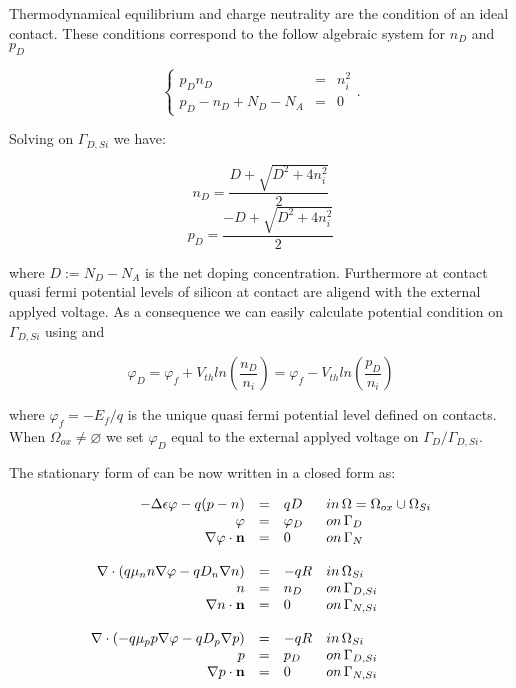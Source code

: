 Thermodynamical equilibrium and charge neutrality are the condition of an ideal contact. These conditions correspond to the follow algebraic system for $n_D$ and $p_D$

\begin{equation}
\label{eq: systemo for dirichlet condition}
\left\{
\begin{array}{lcl}
p_Dn_D & = &n_i^2 \\
p_D -n_D +N_D-N_A & = & 0 
\end{array}
\right. .
\end{equation}

Solving  on $\Gamma_{D,Si}$ we have:

\begin{equation}
n_D = \dfrac{D + \sqrt{D^2+4n_i^2}}{2}
\end{equation}
\begin{equation}
p_D = \dfrac{-D + \sqrt{D^2+4n_i^2}}{2}
\end{equation}

where $D := N_D-N_A$ is the net doping concentration. Furthermore  at contact quasi fermi potential levels of silicon at contact are aligend with the external applyed voltage. As a consequence we can easily calculate potential condition on $\Gamma_{D,Si}$ using  and 

\begin{equation}
\varphi_D = \varphi_f + V_{th}ln\left( \dfrac{n_D}{n_i} \right) = \varphi_f - V_{th}ln\left( \dfrac{p_D}{n_i} \right)
\end{equation}

where $\varphi_f = - E_f / q$ is the unique quasi fermi potential level defined on contacts. When $\Omega_{ox} \neq \varnothing$ we set $\varphi_D$ equal to the external applyed voltage on $\Gamma_D / \Gamma_{D,Si}$.


The stationary form of  can be now written in a closed form as:
 

\begin{equation}
\label{eq: system closed}
\begin{array}{rcll}
- \Delta \epsilon \varphi - q(p-n) & =  & qD & in \, \Omega = \Omega_{ox} \cup \Omega_{Si}\\
\varphi & = & \varphi_D & on \, \Gamma_D \\
\nabla \varphi \cdot \mathbf{n} & = & 0 & on \, \Gamma_N 
\\
\\
\nabla \cdot ( q\mu_n n \nabla \varphi - qD_n \nabla n ) & = & - qR & in \, \Omega_{Si}\\
n & = & n_D & on \, \Gamma_{D,Si} \\
\nabla n \cdot \mathbf{n} & = & 0 & on \, \Gamma_{N,Si}
\\
\\
\nabla \cdot (- q\mu_p p \nabla \varphi - qD_p \nabla p )& = & -qR& in \, \Omega_{Si}\\
p & = & p_D & on \, \Gamma_{D,Si} \\
\nabla p \cdot \mathbf{n} & = & 0 & on \, \Gamma_{N,Si}
\end{array}
\end{equation}

